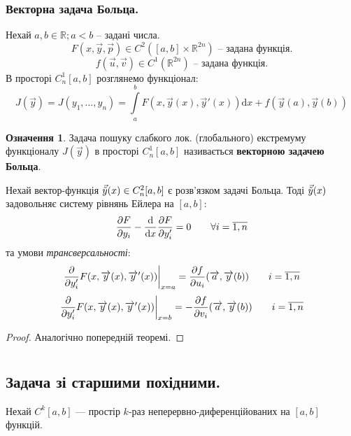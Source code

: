 \documentclass[14pt,a4paper]{scrartcl}
\theoremstyle{definition}
\newtheorem*{defo}{Означення}
\theoremstyle{definition}
\theoremstyle{definition}
\begin{document}
\subsubsection{Векторна задача Больца.}
Нехай $a,b \in \mathbb{R}; a<b$ -- задані числа.
$$
F(x,\overrightarrow{y}, \overrightarrow{p}) \in C^2([a,b]\times \mathbb{R}^{2n}) \text{ -- задана функція.}
$$
$$
f(\overrightarrow{u}, \overrightarrow{v})\in C^1(\mathbb{R}^{2n}) \text{ -- задана функція.}
$$
В просторі $C_n^1[a,b]$ розглянемо функціонал:
$$
J(\overrightarrow{y}) = J(y_1, \dots , y_n) =  \int\limits_{a}^{b}{ F(x, \overrightarrow{y}(x), \overrightarrow{y}'(x))} \mathrm{d} x + f(\overrightarrow{y}(a), \overrightarrow{y}(b))
$$
\begin{defo}
 Задача пошуку слабкого лок. (глобального) екстремуму функціоналу $J(\overrightarrow{y})$ в просторі $C_n^1 [a,b]$ називається \textbf{ векторною задачею Больца}.
\end{defo}
\begin{boxteo}
 Нехай вектор-функція $\vec{\tilde{y}} (x) \in C_n^2 [a,b]$ є розв'язком задачі Больца. Тоді $\vec{\tilde{y}} (x)$ задовольняє систему рівнянь Ейлера на $[a,b]$:
 $$
 \frac{\partial F}{\partial y_i} - \frac{\mathrm{d}}{ \mathrm{d} x} \frac{\partial F}{\partial y_i'}  = 0 \qquad \forall i = \overline{1, n}
 $$
 та умови \textit{трансверсальності}:
 $$
 \frac{\partial}{\partial y_i'} F(x, \overrightarrow{y}(x),  \overrightarrow{y}'(x))\bigg|_{x =a} = \frac{\partial f}{\partial u_i} (\overrightarrow{a}, \overrightarrow{y}(b)) \qquad i = \overline{1,n}
 $$
 $$
  \frac{\partial}{\partial y_i'} F(x, \overrightarrow{y}(x),  \overrightarrow{y}'(x))\bigg|_{x =b} =- \frac{\partial f}{\partial v_i} (\overrightarrow{a}, \overrightarrow{y}(b)) \qquad i = \overline{1,n}
 $$
 \begin{proof}
  Аналогічно попередній теоремі.
 \end{proof}
\end{boxteo}
\section{}
\subsection{Задача зі старшими похідними.}
Нехай $C^k [a,b]$ --- простір $k$-раз неперервно-диференційованих на $[a,b]$ функцій.\par
\end{document}
